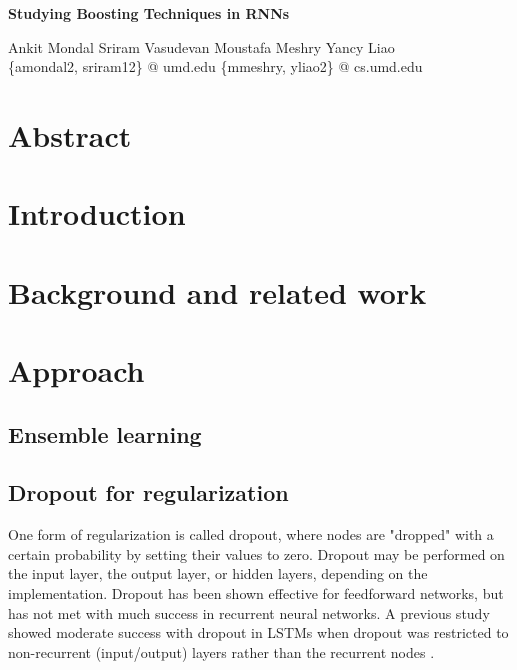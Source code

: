 \documentclass[a4paper,12pt]{article}
\begin{document}
\begin{center}

\textbf{
Studying Boosting Techniques in RNNs\\
}

{\small Ankit Mondal \quad Sriram Vasudevan \qquad Moustafa Meshry \quad Yancy Liao}\\
{\scriptsize \{amondal2, sriram12\} @ umd.edu \qquad \qquad \qquad \{mmeshry, yliao2\} @ cs.umd.edu}
\end{center}

\section{Abstract}





\section{Introduction}




\section{Background and related work}




\section{Approach}

\subsection{Ensemble learning}

\subsection{Dropout for regularization}
One form of regularization is called dropout, where nodes are "dropped" with a certain probability by setting their values to zero. Dropout may be performed on the input layer, the output layer, or hidden layers, depending on the implementation. Dropout has been shown effective for feedforward networks, but has not met with much success in recurrent neural networks. A previous study showed moderate success with dropout in LSTMs when dropout was restricted to non-recurrent (input/output) layers rather than the recurrent nodes \cite{zaremba2015dropout}.\\
\end{document}
